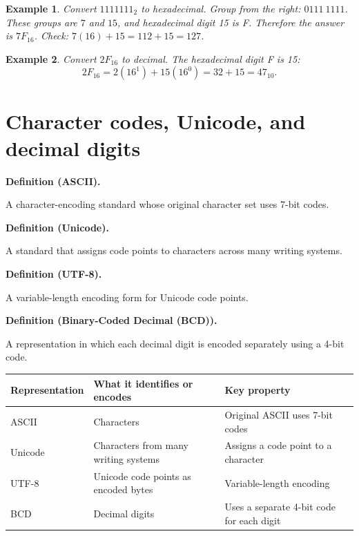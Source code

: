 \documentclass[11pt]{article}
\newtheorem{example}{Example}[section]
\newenvironment{definitionbox}[1]{%
  \par\noindent\textbf{Definition (#1).}\ \itshape
}{\par\vspace{0.3em}}
\begin{document}
\begin{example}
Convert $1111111_2$ to hexadecimal. Group from the right:
$0111\ 1111$. These groups are $7$ and $15$, and hexadecimal digit 15 is
F. Therefore the answer is $7F_{16}$. Check:
$7(16)+15=112+15=127$.
\end{example}

\begin{example}
Convert $2F_{16}$ to decimal. The hexadecimal digit F is 15:
\[
2F_{16}=2(16^1)+15(16^0)=32+15=47_{10}.
\]
\end{example}

\section{Character codes, Unicode, and decimal digits}
\begin{definitionbox}{ASCII}
A character-encoding standard whose original character set uses 7-bit
codes.
\end{definitionbox}

\begin{definitionbox}{Unicode}
A standard that assigns code points to characters across many writing
systems.
\end{definitionbox}

\begin{definitionbox}{UTF-8}
A variable-length encoding form for Unicode code points.
\end{definitionbox}

\begin{definitionbox}{Binary-Coded Decimal (BCD)}
A representation in which each decimal digit is encoded separately using a
4-bit code.
\end{definitionbox}

\begin{center}
\begin{tabular}{p{}p{}p{}}
\toprule
\textbf{Representation} & \textbf{What it identifies or encodes} & \textbf{Key property}\\
\midrule
ASCII & Characters & Original ASCII uses 7-bit codes\\
Unicode & Characters from many writing systems & Assigns a code point to a character\\
UTF-8 & Unicode code points as encoded bytes & Variable-length encoding\\
BCD & Decimal digits & Uses a separate 4-bit code for each digit\\
\bottomrule
\end{tabular}
\end{center}
\end{document}
